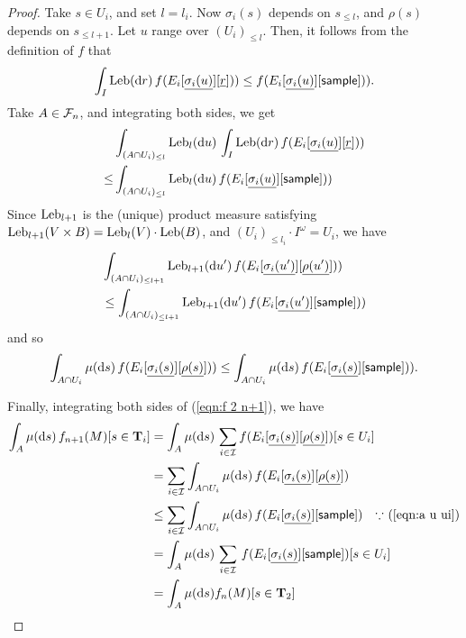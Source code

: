 \begin{proof}
Take $s \in U_i$, and set $l = l_i$.
Now $\sigma_i(s)$ depends on $s_{\leq l}$, and $\rho(s)$ depends on $s_{\leq l +1}$.
Let $u$ range over $(U_i)_{\leq l}$.
Then, it follows from the definition of $f$ that
\[
\int_I \mathrm{Leb}(\mathrm{d} r) \, f(E_i[\underline{\sigma_i(u)}][\underline{r}])) \leq f(E_i[\underline{\sigma_i(u)}][\textsf{sample}])).
\]
Take $A \in \mathcal{F}_n$, and integrating both sides, we get
\begin{align*}
& \int_{(A \cap U_i)_{\leq l}} \mathrm{Leb}_l(\mathrm{d} u) \, \int_I \textrm{Leb}(\mathrm{d} r) \, f(E_i[\underline{\sigma_i(u)}][\underline{r}])) \\
\leq & \int_{(A \cap U_i)_{\leq l}} \mathrm{Leb}_l(\mathrm{d} u) \, f(E_i[\underline{\sigma_i(u)}][\textsf{sample}]))
\end{align*}
Since $\mathrm{Leb}_{l+1}$ is the (unique) product measure satisfying $\mathrm{Leb}_{l+1}(V \times B) = \mathrm{Leb}_l(V) \cdot \mathrm{Leb}(B)$, and $(U_i)_{\leq l_i} \cdot I^\omega = U_i$, we have
\begin{align*}
& \int_{(A \cap U_i)_{\leq l+1}} \mathrm{Leb}_{l+1}(\mathrm{d} u') \, f(E_i[\underline{\sigma_i(u')}][\underline{\rho(u')}])) \\
& \leq 
\int_{(A \cap U_i)_{\leq l+1}} \mathrm{Leb}_{l+1}(\mathrm{d} u') \, f(E_i[\underline{\sigma_i(u')}][\textsf{sample}]))
\end{align*}
and so 
\begin{equation}
\int_{A \cap U_i} \mu(\mathrm{d} s) \, f(E_i[\underline{\sigma_i(s)}][\underline{\rho(s)}])) \\
\leq 
\int_{A \cap U_i} \mu(\mathrm{d} s) \, f(E_i[\underline{\sigma_i(s)}][\textsf{sample}])).
\label{eqn:a u ui}
\end{equation}

Finally, integrating both sides of (\ref{eqn:f 2 n+1}), we have
\begin{align*}
\int_A \mu(\mathrm{d} s) \, f_{n+1}(M)[s \in \mathbf{T}_i] 
&= 
\int_A \mu(\mathrm{d} s) \, \sum_{i \in \mathcal{I}} f(E_i[\underline{\sigma_i(s)}][\underline{\rho(s)}])[s \in U_i] \\
&= 
\sum_{i \in \mathcal{I}} \int_{A \cap U_i} \mu(\mathrm{d} s) \, f(E_i[\underline{\sigma_i(s)}][\underline{\rho(s)}])\\
&\leq 
\sum_{i \in \mathcal{I}} \int_{A \cap U_i} \mu(\mathrm{d} s) \, f(E_i[\underline{\sigma_i(s)}][\textsf{sample}])
\quad \hbox{$\because$ (\ref{eqn:a u ui})}\\
&= 
\int_{A} \mu(\mathrm{d} s) \, \sum_{i \in \mathcal{I}} \, f(E_i[\underline{\sigma_i(s)}][\textsf{sample}])[s \in U_i]\\
&= \int_{A} \mu(\mathrm{d} s) f_{n}(M)[s \in \mathbf{T}_2]
\end{align*}

\end{proof}

